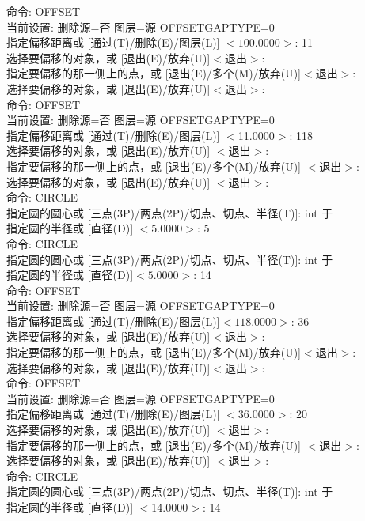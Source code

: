 命令: OFFSET\\
当前设置: 删除源=否  图层=源  OFFSETGAPTYPE=0\\
指定偏移距离或 [通过(T)/删除(E)/图层(L)] $<100.0000>$:  11\\
选择要偏移的对象，或 [退出(E)/放弃(U)]$ <$退出$>$:\\
指定要偏移的那一侧上的点，或 [退出(E)/多个(M)/放弃(U)]$ <$退出$>$:\\
选择要偏移的对象，或 [退出(E)/放弃(U)]$ <$退出$>$:\\
命令:  OFFSET\\
当前设置: 删除源=否  图层=源  OFFSETGAPTYPE=0\\
指定偏移距离或 [通过(T)/删除(E)/图层(L)] $<$11.0000$>$:  118\\
选择要偏移的对象，或 [退出(E)/放弃(U)] $<$退出$>$:\\
指定要偏移的那一侧上的点，或 [退出(E)/多个(M)/放弃(U)] $<$退出$>$:\\
选择要偏移的对象，或 [退出(E)/放弃(U)] $<$退出$>$:\\
命令: CIRCLE \\
指定圆的圆心或 [三点(3P)/两点(2P)/切点、切点、半径(T)]: int 于\\
指定圆的半径或 [直径(D)] $<5.0000>$: 5\\
命令: CIRCLE \\
指定圆的圆心或 [三点(3P)/两点(2P)/切点、切点、半径(T)]: int 于\\
指定圆的半径或 [直径(D)]$ <5.0000>$: 14\\

命令: OFFSET\\
当前设置: 删除源=否  图层=源  OFFSETGAPTYPE=0\\
指定偏移距离或 [通过(T)/删除(E)/图层(L)]$ <118.0000>$:  36\\
选择要偏移的对象，或 [退出(E)/放弃(U)]$ <$退出$>$:\\
指定要偏移的那一侧上的点，或 [退出(E)/多个(M)/放弃(U)]$ <$退出$>$:\\
选择要偏移的对象，或 [退出(E)/放弃(U)]$ <$退出$>$:\\
命令:  OFFSET\\
当前设置: 删除源=否  图层=源  OFFSETGAPTYPE=0\\
指定偏移距离或 [通过(T)/删除(E)/图层(L)] $<36.0000>$:  20\\
选择要偏移的对象，或 [退出(E)/放弃(U)] $<$退出$>$:\\
指定要偏移的那一侧上的点，或 [退出(E)/多个(M)/放弃(U)] $<$退出$>$:\\
选择要偏移的对象，或 [退出(E)/放弃(U)] $<$退出$>$:\\
命令: CIRCLE \\
指定圆的圆心或 [三点(3P)/两点(2P)/切点、切点、半径(T)]: int 于\\
指定圆的半径或 [直径(D)] $<$14.0000$>$: 14\\

